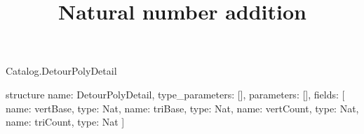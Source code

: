\begin{lexlean}{Catalog.DetourPolyDetail}
\title{Natural number addition}
\begin{semanticmodule}
structure{
  name: DetourPolyDetail,
  type_parameters: [],
  parameters: [],
  fields: [
    {name: vertBase, type: Nat},
    {name: triBase, type: Nat},
    {name: vertCount, type: Nat},
    {name: triCount, type: Nat}
  ]
}
\end{semanticmodule}
\end{lexlean}
